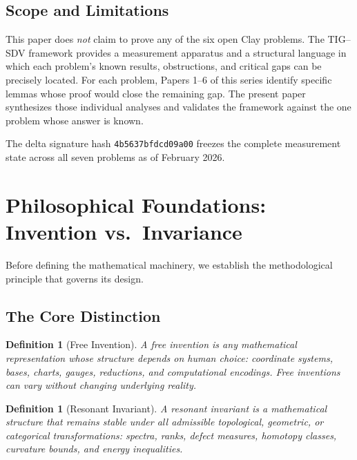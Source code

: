\documentclass[11pt]{article}
\newtheorem{definition}[theorem]{Definition}
\begin{document}
\subsection{Scope and Limitations}

This paper does \emph{not} claim to prove any of the six open Clay
problems.  The TIG--SDV framework provides a measurement apparatus and
a structural language in which each problem's known results, obstructions,
and critical gaps can be precisely located.  For each problem,
Papers 1--6 of this series identify specific lemmas whose proof would
close the remaining gap.  The present paper synthesizes those individual
analyses and validates the framework against the one problem whose
answer is known.

The delta signature hash \texttt{4b5637bfdcd09a00} freezes the complete
measurement state across all seven problems as of February 2026.

\section{Philosophical Foundations: Invention vs.\ Invariance}
\label{sec:foundations}

Before defining the mathematical machinery, we establish the methodological
principle that governs its design.

\subsection{The Core Distinction}

\begin{definition}[Free Invention]\label{def:free-invention}
A \emph{free invention} is any mathematical representation whose structure depends on
human choice: coordinate systems, bases, charts, gauges, reductions, and computational
encodings. Free inventions can vary without changing underlying reality.
\end{definition}

\begin{definition}[Resonant Invariant]\label{def:resonant-invariant}
A \emph{resonant invariant} is a mathematical structure that remains stable under all
admissible topological, geometric, or categorical transformations: spectra, ranks,
defect measures, homotopy classes, curvature bounds, and energy inequalities.
\end{definition}
\end{document}
